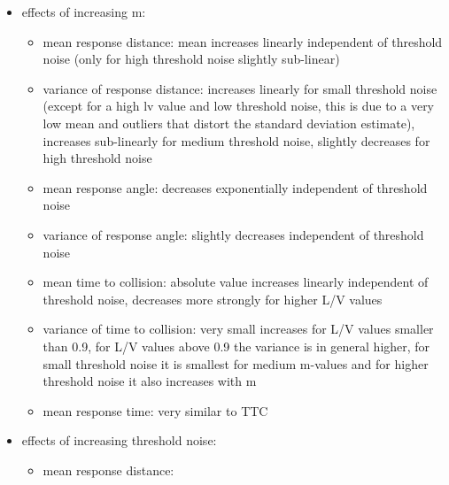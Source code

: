 \documentclass[a4paper,10pt,hidelinks]{scrreprt}
\begin{document}
	\begin{itemize}
		\item effects of increasing m:
		\begin{itemize}
			\item mean response distance: mean increases linearly independent 
			of threshold noise (only for high threshold noise slightly 
			sub-linear)
			\item variance of response distance: increases linearly for small 
			threshold noise (except for a high lv value and low threshold 
			noise, this is due to a very low mean and outliers that distort the 
			standard deviation estimate), increases sub-linearly for medium 
			threshold noise, slightly decreases for high threshold noise
			\item mean response angle: decreases exponentially  independent of 
			threshold noise
			\item variance of response angle: slightly decreases independent of 
			threshold noise
			\item mean time to collision: absolute value increases linearly 
			independent of threshold noise, decreases more strongly for higher 
			L/V values
			\item variance of time to collision: very small increases for L/V 
			values smaller than 0.9, for L/V values above 0.9 the variance is 
			in general higher, for small threshold noise it is smallest for 
			medium m-values and for higher threshold noise it also increases 
			with m
			\item mean response time: very similar to TTC
		\end{itemize}
		\item effects of increasing threshold noise:
		\begin{itemize}
			\item mean response distance: 
		\end{itemize}
	\end{itemize}
\end{document}
